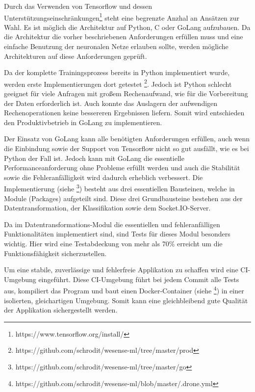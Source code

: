         Durch das Verwenden von Tensorflow und dessen Unterstützungseinschränkungen\footnote{https://www.tensorflow.org/install/} steht eine begrenzte Anzhal an Ansätzen zur Wahl.
        Es ist möglich die Architektur auf Python, C oder GoLang aufzubauen.
        Da die Architektur die vorher beschriebenen Anforderungen erfüllen muss und eine einfache Benutzung der neuronalen Netze erlauben sollte, werden mögliche Architekturen auf diese Anforderungen geprüft.
        \newline

        Da der komplette Trainingsprozess bereits in Python implementiert wurde, werden erste Implementierungen dort getestet \footnote{https://github.com/schrodit/wesense-ml/tree/master/prod}.
        Jedoch ist Python schlecht geeignet für viele Anfragen mit großem Rechenaufwand, wie für die Vorbereitung der Daten erforderlich ist.
        Auch konnte das Auslagern der aufwendigen Rechenoperationen keine bessereren Ergebnissen liefern.
        Somit wird entschieden den Produktivbetrieb in GoLang zu implementieren.
        \newline

        Der Einsatz von GoLang kann alle benötigten Anforderungen erfüllen, auch wenn die Einbindung sowie der Support von Tensorflow nicht so gut ausfällt, wie es bei Python der Fall ist.
        Jedoch kann mit GoLang die essentielle Performanceanforderung ohne Probleme erfüllt werden und auch die Stabilität sowie die Fehleranfälligkeit wird dadurch erheblich verbessert.
        Die Implementierung (siehe \footnote{https://github.com/schrodit/wesense-ml/tree/master/go}) besteht aus drei essentiellen Bausteinen, welche in Module (Packages) aufgeteilt sind.
        Diese drei Grundbausteine bestehen aus der Datentransformation, der Klassifikation sowie dem Socket.IO-Server.
        \newline

        Da im Datentransformations-Modul die essentiellen und fehleranfälligen Funktionalitäten implementiert sind, sind Tests für dieses Modul besonders wichtig.
        Hier wird eine Testabdeckung von mehr als 70\% erreicht um die Funktionsfähigkeit sicherzustellen.
        \newline

        Um eine stabile, zuverlässige und fehlerfreie Applikation zu schaffen wird eine \ac{CI}-Umgebung eingeführt.
        Diese \ac{CI}-Umgebung führt bei jedem Commit alle Tests aus, kompiliert das Program und baut einen Docker-Container (siehe \footnote{https://github.com/schrodit/wesense-ml/blob/master/.drone.yml}) in einer isolierten, gleichartigen Umgebung.
        Somit kann eine gleichbleibend gute Qualität der Applikation sichergestellt werden.
    
